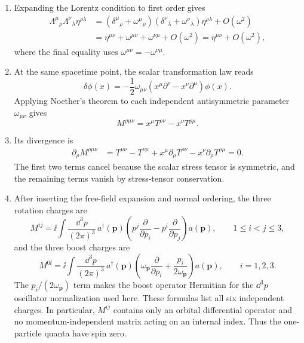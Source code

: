 \begin{enumerate}
\begin{enumerate}
\item
Expanding the Lorentz condition to first order gives
\[
\begin{split}
 \Lambda^\mu{}_\rho\Lambda^\nu{}_\lambda\eta^{\rho\lambda}
 &=(\delta^\mu{}_\rho+\omega^\mu{}_\rho)
   (\delta^\nu{}_\lambda+\omega^\nu{}_\lambda)
   \eta^{\rho\lambda}+O(\omega^2)\\
 &=\eta^{\mu\nu}+\omega^{\mu\nu}+\omega^{\nu\mu}
   +O(\omega^2)=\eta^{\mu\nu}+O(\omega^2),
\end{split}
\]
where the final equality uses \(\omega^{\mu\nu}=-\omega^{\nu\mu}\).
\item
At the same spacetime point, the scalar transformation law reads
\[
 \delta\phi(x)
 =-\frac12\omega_{\mu\nu}
 (x^\mu\partial^\nu-x^\nu\partial^\mu)\phi(x).
\]
Applying Noether's theorem to each independent antisymmetric parameter
\(\omega_{\mu\nu}\) gives
\[
 M^{\rho\mu\nu}=x^\mu T^{\rho\nu}-x^\nu T^{\rho\mu}.
\]
\item
Its divergence is
\[
\begin{split}
 \partial_\rho M^{\rho\mu\nu}
 &=T^{\mu\nu}-T^{\nu\mu}
   +x^\mu\partial_\rho T^{\rho\nu}
   -x^\nu\partial_\rho T^{\rho\mu}=0.
\end{split}
\]
The first two terms cancel because the scalar stress tensor is symmetric,
and the remaining terms vanish by stress-tensor conservation.
\item
After inserting the free-field expansion and normal ordering, the three
rotation charges are
\[
 M^{ij}=\ii\int\frac{\dd^3p}{(2\pi)^3}\,
 a^\dagger(\mathbf p)
 \left(p^j\frac{\partial}{\partial p_i}
 -p^i\frac{\partial}{\partial p_j}\right)a(\mathbf p),
\qquad 1\leq i<j\leq3,
\]
and the three boost charges are
\[
 M^{0\ii}=\ii\int\frac{\dd^3p}{(2\pi)^3}\,
 a^\dagger(\mathbf p)
 \left(\omega_{\mathbf p}\frac{\partial}{\partial p_i}
 +\frac{p_i}{2\omega_{\mathbf p}}\right)a(\mathbf p),
\qquad i=1,2,3.
\]
The \(p_i/(2\omega_{\mathbf p})\) term makes the boost operator Hermitian for
the \(\dd^3p\) oscillator normalization used here.  These formulas list all
six independent charges.  In particular, \(M^{ij}\) contains only an
orbital differential operator and no momentum-independent matrix acting on
an internal index.  Thus the one-particle quanta have spin zero.
\end{enumerate}


\end{enumerate}
